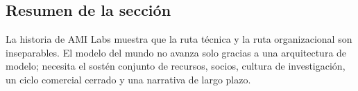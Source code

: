 \subsection{Resumen de la sección}

La historia de AMI Labs muestra que la ruta técnica y la ruta organizacional son inseparables. El modelo del mundo no avanza solo gracias a una arquitectura de modelo; necesita el sostén conjunto de recursos, socios, cultura de investigación, un ciclo comercial cerrado y una narrativa de largo plazo.
